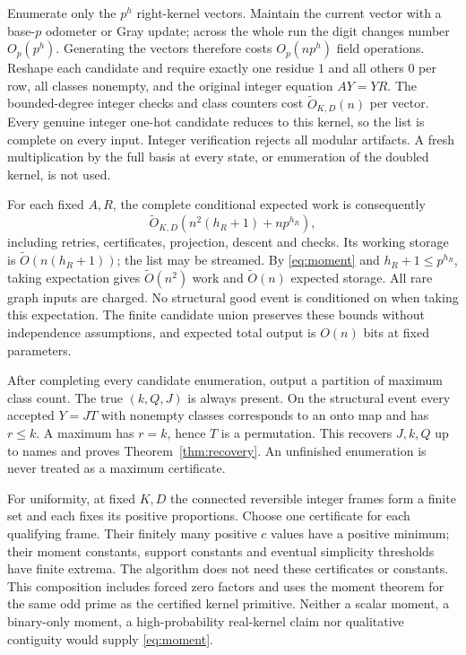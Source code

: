 \documentclass[11pt]{article}
\begin{document}
Enumerate only the $p^h$ right-kernel vectors. Maintain the current vector with a base-$p$ odometer or Gray update; across the whole run the digit changes number $O_p(p^h)$. Generating the vectors therefore costs $O_p(np^h)$ field operations. Reshape each candidate and require exactly one residue $1$ and all others $0$ per row, all classes nonempty, and the original integer equation $AY=YR$. The bounded-degree integer checks and class counters cost $\widetilde O_{K,D}(n)$ per vector. Every genuine integer one-hot candidate reduces to this kernel, so the list is complete on every input. Integer verification rejects all modular artifacts. A fresh multiplication by the full basis at every state, or enumeration of the doubled kernel, is not used.

For each fixed $A,R$, the complete conditional expected work is consequently
\begin{equation}\label{eq:work}
 \widetilde O_{K,D}(n^2(h_R+1)+np^{h_R}),
\end{equation}
including retries, certificates, projection, descent and checks. Its working storage is $\widetilde O(n(h_R+1))$; the list may be streamed. By \eqref{eq:moment} and $h_R+1\le p^{h_R}$, taking expectation gives $\widetilde O(n^2)$ work and $\widetilde O(n)$ expected storage. All rare graph inputs are charged. No structural good event is conditioned on when taking this expectation. The finite candidate union preserves these bounds without independence assumptions, and expected total output is $O(n)$ bits at fixed parameters.

After completing every candidate enumeration, output a partition of maximum class count. The true $(k,Q,J)$ is always present. On the structural event every accepted $Y=JT$ with nonempty classes corresponds to an onto map and has $r\le k$. A maximum has $r=k$, hence $T$ is a permutation. This recovers $J,k,Q$ up to names and proves Theorem~\ref{thm:recovery}. An unfinished enumeration is never treated as a maximum certificate.

For uniformity, at fixed $K,D$ the connected reversible integer frames form a finite set and each fixes its positive proportions. Choose one certificate for each qualifying frame. Their finitely many positive $c$ values have a positive minimum; their moment constants, support constants and eventual simplicity thresholds have finite extrema. The algorithm does not need these certificates or constants. This composition includes forced zero factors and uses the moment theorem for the same odd prime as the certified kernel primitive. Neither a scalar moment, a binary-only moment, a high-probability real-kernel claim nor qualitative contiguity would supply \eqref{eq:moment}.
\end{document}
